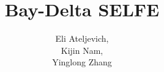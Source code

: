 \documentclass[11pt,twoside]{report}
\title{Bay-Delta SELFE}
\author{Eli Ateljevich,\\Kijin Nam,\\Yinglong Zhang}
\begin{document}
\maketitle
\thispagestyle{empty}

\newcommand{\explain}[2]{\underset{\mathclap{\overset{\uparrow}{#2}}}{#1}}
\newcommand{\explainup}[2]{\overset{\mathclap{\underset{\downarrow}{#2}}}{#1}}



\tableofcontents









 
\printglossaries
\end{document}
